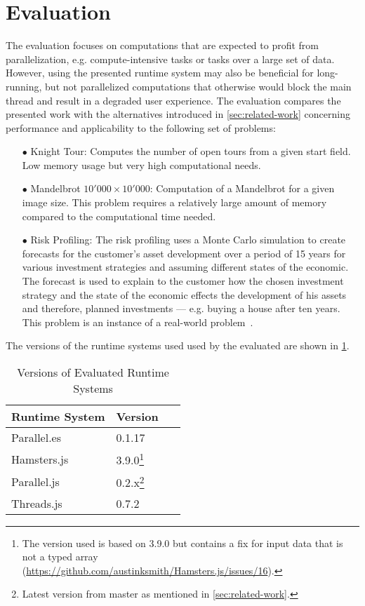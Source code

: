 \section{Evaluation}\label{sec:evaluation}
The evaluation focuses on computations that are expected to profit from parallelization, e.g. compute-intensive tasks or tasks over a large set of data. However, using the presented runtime system may also be beneficial for long-running, but not parallelized computations that otherwise would block the main thread and result in a degraded user experience. The evaluation compares the presented work with the alternatives introduced in \cref{sec:related-work} concerning performance and applicability to the following set of problems:

\begin{itemize}
	\item[$\bullet$] Knight Tour: Computes the number of open tours from a given start field. Low memory usage but very high computational needs.
	\item[$\bullet$] Mandelbrot $10'000 \times 10'000$: Computation of a Mandelbrot for a given image size. This problem requires a relatively large amount of memory compared to the computational time needed.
	\item[$\bullet$] Risk Profiling: The risk profiling uses a Monte Carlo simulation to create forecasts for the customer's asset development over a period of 15 years for various investment strategies and assuming different states of the economic. The forecast is used to explain to the customer how the chosen investment strategy and the state of the economic effects the development of his assets and therefore, planned investments --- e.g. buying a house after ten years. This problem is an instance of a real-world problem~\cite{Kwsoft2016}.
\end{itemize}

The versions of the runtime systems used used by the evaluated are shown in \cref{tab:runtime-system-version}.

\begin{table}
	\centering
	\begin{tabular}{p{0.6\linewidth} l}
		\toprule
		Runtime System & Version \\ \midrule
		Parallel.es & 0.1.17 \\
		Hamsters.js & 3.9.0\footnote{The version used is based on 3.9.0 but contains a fix for input data that is not a typed array (\url{https://github.com/austinksmith/Hamsters.js/issues/16}).} \\
		Parallel.js & 0.2.x\footnote{Latest version from master as mentioned in \cref{sec:related-work}.} \\
		Threads.js & 0.7.2 \\ \bottomrule
	\end{tabular}
	\caption{Versions of Evaluated Runtime Systems}
	\label{tab:runtime-system-version}
\end{table}


